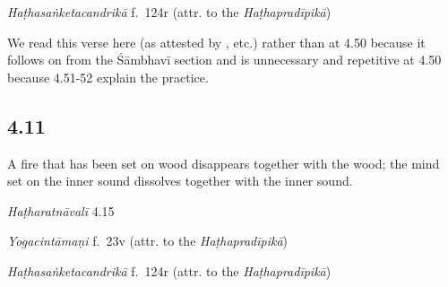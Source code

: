 \begin{ekdosis}
\begin{testimonia}[hp04_010]
\emph{Haṭhasaṅketacandrikā} f.~124r (attr. to the \emph{Haṭhapradīpikā})
\begin{versinnote}
\tl{\var{dakṣiṇe karṇe ] B220,  dakṣirṇe 2244}\\+}
\tl{\var{ekāṃtike ] 2244, ekāṃtate B220}\\!}
\end{versinnote}
\end{testimonia}

\begin{philcomm}[hp04_010]
We read this verse here (as attested by \textalpha, etc.) rather than at 4.50 because it follows on from the Śāmbhavī section and is unnecessary and repetitive at 4.50 because 4.51-52 explain the practice.
\end{philcomm}

\subsection*{4.11}
\begin{translation}[hp04_011]
A fire that has been set on wood disappears together with the wood; the mind set on the inner sound dissolves together with the inner sound.
\end{translation}


\begin{testimonia}[hp04_011]
\emph{Haṭharatnāvalī} 4.15
\begin{versinnote}
\end{versinnote}

\emph{Yogacintāmaṇi} f.~23v (attr. to the \emph{Haṭhapradīpikā})
\begin{versinnote}
\end{versinnote}

\emph{Haṭhasaṅketacandrikā} f.~124r (attr. to the \emph{Haṭhapradīpikā})
\begin{versinnote}
\end{versinnote}
\end{testimonia}


\end{ekdosis}
